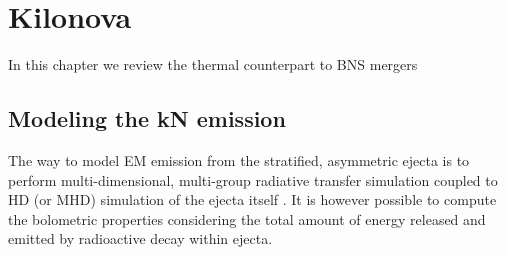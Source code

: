 \chapter{Kilonova} \label{ch:kilonova} 

In this chapter we review the thermal counterpart to \ac{BNS} mergers 









\section{Modeling the \ac{kN} emission}

The way to model \ac{EM} emission from the stratified, asymmetric ejecta is to perform 
multi-dimensional, multi-group radiative transfer simulation coupled to \ac{HD} (or \ac{MHD}) 
simulation of the ejecta itself \cite[\eg][]{Bulla:2019muo}.
%
It is however possible to compute the bolometric properties considering the total amount 
of energy released and emitted by radioactive decay within ejecta. 

%
%




